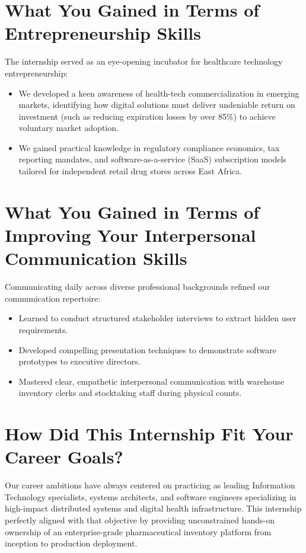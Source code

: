 \section{What You Gained in Terms of Entrepreneurship Skills}
The internship served as an eye-opening incubator for healthcare technology entrepreneurship:
\begin{itemize}
    \item We developed a keen awareness of health-tech commercialization in emerging markets, identifying how digital solutions must deliver undeniable return on investment (such as reducing expiration losses by over 85\%) to achieve voluntary market adoption.
    \item We gained practical knowledge in regulatory compliance economics, tax reporting mandates, and software-as-a-service (SaaS) subscription models tailored for independent retail drug stores across East Africa.
\end{itemize}

\section{What You Gained in Terms of Improving Your Interpersonal Communication Skills}
Communicating daily across diverse professional backgrounds refined our communication repertoire:
\begin{itemize}
    \item Learned to conduct structured stakeholder interviews to extract hidden user requirements.
    \item Developed compelling presentation techniques to demonstrate software prototypes to executive directors.
    \item Mastered clear, empathetic interpersonal communication with warehouse inventory clerks and stocktaking staff during physical counts.
\end{itemize}

\section{How Did This Internship Fit Your Career Goals?}
Our career ambitions have always centered on practicing as leading Information Technology specialists, systems architects, and software engineers specializing in high-impact distributed systems and digital health infrastructure. This internship perfectly aligned with that objective by providing unconstrained hands-on ownership of an enterprise-grade pharmaceutical inventory platform from inception to production deployment.


